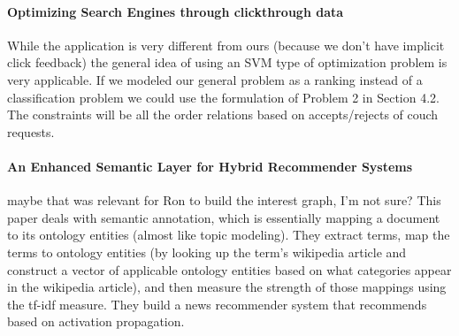 \paragraph{Optimizing Search Engines through clickthrough data} \cite{Joachims2002}
While the application is very different from ours (because we don't have implicit click feedback) the general idea of using an SVM type of optimization problem is very applicable.
If we modeled our general problem as a ranking instead of a classification problem we could use the formulation of Problem 2 in Section 4.2.
The constraints will be all the order relations based on accepts/rejects of couch requests.

\paragraph{An Enhanced Semantic Layer for Hybrid Recommender Systems} \cite{Cantador2011}
 maybe that was relevant for Ron to build the interest graph, I'm not sure?
This paper deals with semantic annotation, which is essentially mapping a document to its ontology entities (almost like topic modeling). They extract terms, map the terms to ontology entities (by looking up the term's wikipedia article and construct a vector of applicable ontology entities based on what categories appear in the wikipedia article), and then measure the strength of those mappings using the tf-idf measure.
They build a news recommender system that recommends based on activation propagation.




